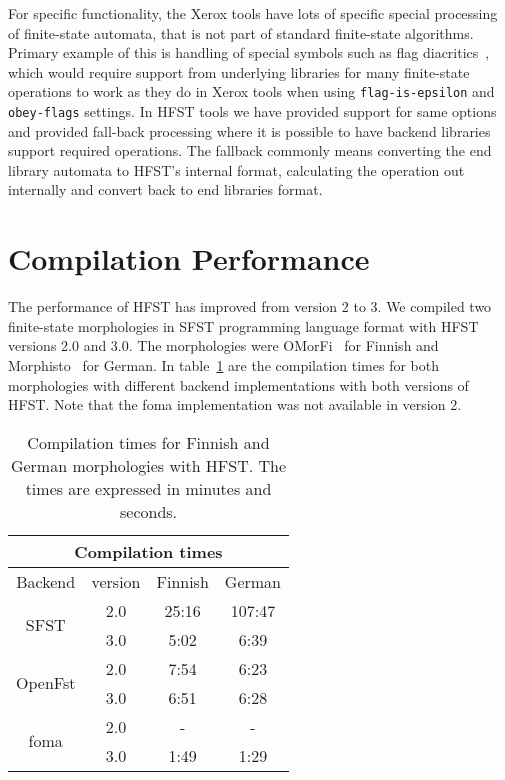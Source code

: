 \documentclass{llncs}
\begin{document}
For specific functionality, the Xerox tools have lots of specific special
processing of finite-state automata, that is not part of standard finite-state
algorithms. Primary example of this is handling of special symbols such as
flag diacritics~\cite{beesley/1998}, which would require support from underlying
libraries for many finite-state operations to work as they do in Xerox tools
when using \texttt{flag-is-epsilon} and \texttt{obey-flags} settings. In
HFST tools we have provided support for same options and provided fall-back
processing where it is possible to have backend libraries support required
operations. The fallback commonly means converting the end library
automata to HFST's internal format, calculating the operation out internally
and convert back to end libraries format. 

\section{Compilation Performance}

The performance of HFST has improved from version 2 to 3. 
We compiled two finite-state morphologies in SFST programming language format
with HFST versions 2.0 and 3.0. 
The morphologies were OMorFi~\cite{pirinen/2008} for Finnish and 
Morphisto~\cite{zielinski/2009} for German.
In table~\ref{tab:compilation_times} are the compilation times 
for both morphologies with 
different backend implementations with both versions of HFST. 
Note that the foma implementation was not available in version 2.

\begin{table}
\centering
  \begin{tabular}{ c | c | c | c }
  \multicolumn{4}{c}{Compilation times} \\ \hline
  Backend & version & Finnish & German \\ \hline
  \multirow{2}{*}{SFST} & 2.0 & 25:16 & 107:47 \\
  & 3.0 & 5:02 & 6:39 \\ \hline
  \multirow{2}{*}{OpenFst} & 2.0 & 7:54 & 6:23 \\
  & 3.0 & 6:51 & 6:28 \\ \hline
  \multirow{2}{*}{foma} & 2.0 & - & - \\
  & 3.0 & 1:49 & 1:29 \\
  \end{tabular}
  \caption{Compilation times for Finnish and German morphologies with
    HFST. The times are expressed in minutes and seconds.}
  \label{tab:compilation_times}
\end{table}
\end{document}
